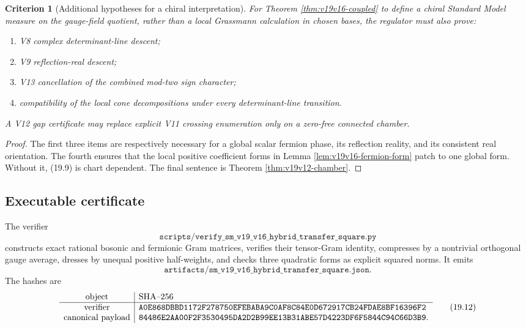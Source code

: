 \documentclass[11pt]{article}
\newtheorem{criterion}[theorem]{Criterion}
\theoremstyle{remark}
\begin{document}
\begin{criterion}[Additional hypotheses for a chiral interpretation]
\label{crit:v19v16-chiral}
For Theorem \ref{thm:v19v16-coupled} to define a chiral Standard Model
measure on the gauge-field quotient, rather than a local Grassmann
calculation in chosen bases, the regulator must also prove:
\begin{enumerate}
 \item V8 complex determinant-line descent;
 \item V9 reflection-real descent;
 \item V13 cancellation of the combined mod-two sign character;
 \item compatibility of the local cone decompositions under every
       determinant-line transition.
\end{enumerate}
A V12 gap certificate may replace explicit V11 crossing enumeration only
on a zero-free connected chamber.
\end{criterion}

\begin{proof}
The first three items are respectively necessary for a global scalar
fermion phase, its reflection reality, and its consistent real
orientation.  The fourth ensures that the local positive coefficient
forms in Lemma \ref{lem:v19v16-fermion-form} patch to one global form.
Without it, (19.9) is chart dependent.  The final sentence is Theorem
\ref{thm:v19v12-chamber}.
\end{proof}

\subsection{Executable certificate}

The verifier
\[
 \texttt{scripts/verify\_sm\_v19\_v16\_hybrid\_transfer\_square.py}
                                                                  \tag{19.10}
\]
constructs exact rational bosonic and fermionic Gram matrices, verifies
their tensor-Gram identity, compresses by a nontrivial orthogonal gauge
average, dresses by unequal positive half-weights, and checks three
quadratic forms as explicit squared norms.  It emits
\[
 \texttt{artifacts/sm\_v19\_v16\_hybrid\_transfer\_square.json}.
                                                                  \tag{19.11}
\]
The hashes are
\[
\begin{array}{c|l}
\hbox{object}&\hbox{SHA--256}\\ \hline
\hbox{verifier}&
\texttt{A0E868DBBD1172F278750EFEBABA9C0AF8C84E0D672917CB24FDAE8BF16396F2}\\
\hbox{canonical payload}&
\texttt{84486E2AA00F2F3530495DA2D2B99EE13B31ABE57D4223DF6F5844C94C66D3B9}.
\end{array}                                                     \tag{19.12}
\]
\end{document}
